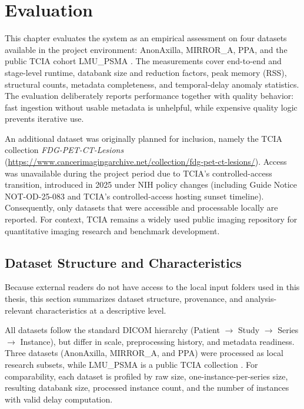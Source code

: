 \chapter{Evaluation}
This chapter evaluates the system as an empirical assessment on four datasets available in the project environment: AnonAxilla, MIRROR\_A, PPA, and the public TCIA cohort LMU\_PSMA \cite{lmu_psma_tcia_2026}. The measurements cover end-to-end and stage-level runtime, databank size and reduction factors, peak memory (RSS), structural counts, metadata completeness, and temporal-delay anomaly statistics. The evaluation deliberately reports performance together with quality behavior: fast ingestion without usable metadata is unhelpful, while expensive quality logic prevents iterative use.

An additional dataset was originally planned for inclusion, namely the TCIA collection \emph{FDG-PET-CT-Lesions} (\url{https://www.cancerimagingarchive.net/collection/fdg-pet-ct-lesions/}). Access was unavailable during the project period due to TCIA's controlled-access transition, introduced in 2025 under NIH policy changes (including Guide Notice NOT-OD-25-083 and TCIA's controlled-access hosting sunset timeline). Consequently, only datasets that were accessible and processable locally are reported. For context, TCIA remains a widely used public imaging repository for quantitative imaging research and benchmark development.

\section{Dataset Structure and Characteristics}
Because external readers do not have access to the local input folders used in this thesis, this section summarizes dataset structure, provenance, and analysis-relevant characteristics at a descriptive level.

All datasets follow the standard DICOM hierarchy (Patient $\rightarrow$ Study $\rightarrow$ Series $\rightarrow$ Instance), but differ in scale, preprocessing history, and metadata readiness. Three datasets (AnonAxilla, MIRROR\_A, and PPA) were processed as local research subsets, while LMU\_PSMA is a public TCIA collection \cite{lmu_psma_tcia_2026}. For comparability, each dataset is profiled by raw size, one-instance-per-series size, resulting databank size, processed instance count, and the number of instances with valid delay computation.

